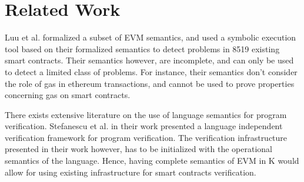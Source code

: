 \section{Related Work}
Luu et al.\cite{luumaking} formalized a subset of EVM semantics, and used a symbolic execution tool based on their formalized semantics to detect problems in 8519 existing smart contracts. Their semantics however, are incomplete, and can only be used to detect a limited class of problems. For instance, their semantics don't consider the role of  gas in ethereum transactions, and cannot be used to prove properties concerning gas on smart contracts. 

There exists extensive literature on the use of language semantics for program verification. Stefanescu et al. \cite{stefanescu-park-yuwen-li-rosu-2016-oopsla} in their work presented a language independent verification framework for program verification. The verification infrastructure presented in their work however, has to be initialized with the operational semantics of the language. Hence, having complete semantics of EVM in K would allow for using existing infrastructure for smart contracts verification.
